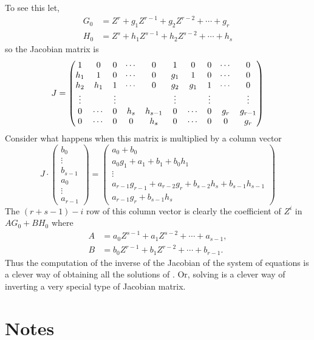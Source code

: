 {To see this let,
\[
\begin{aligned}
  G_0 &= Z^r + g_1 Z^{r-1} + g_2 Z^{r-2} + \cdots + g_r\\
  H_0 &=Z^s + h_1 Z^{s-1} + h_2 Z^{s-2} + \cdots + h_s
\end{aligned}
\]
so the Jacobian matrix is
\[
J = 
\begin{pmatrix}
1&0&0& \cdots&0&1&0&0&\cdots&0\\
h_1&1&0& \cdots&0&g_1&1&0&\cdots&0\\
h_2&h_1&1& \cdots&0&g_2&g_1&1&\cdots&0\\
\vdots&\null&\vdots&\null&\null&\vdots&\null&\vdots&\null&\vdots\\
0&\cdots&0&h_s&h_{s-1}&0&\cdots&0&g_r&g_{r-1}\\
0&\cdots&0&0&h_s&0&\cdots&0&0&g_r
\end{pmatrix}
\]
Consider what happens when this matrix is multiplied by a column vector
\[
J\cdot
\begin{pmatrix}
b_0\\ \vdots \\ b_{s-1}\\ a_0\\ \vdots\\ a_{r-1}
\end{pmatrix}
=
\begin{pmatrix}
a_0 +b_0\\
a_0 g_1 + a_1 + b_1 + b_0 h_1\\
\vdots\\
a_{r-1} g_{r-1} + a_{r-2} g_r + b_{s-2} h_{s} + b_{s-1} h_{s-1}\\
a_{r-1} g_{r} + b_{s-1} h_{s}
\end{pmatrix}
\]
The $(r+ s - 1) - i$ row of this column vector is clearly the coefficient
of $Z^i$ in $A G_0 + B H_0$ where
\[
\begin{aligned}
  A &= a_0 Z^{s-1} + a_1 Z^{s-2} + \cdots + a_{s-1},\\
  B &= b_0 Z^{r-1} + b_1 Z^{r-2} + \cdots + b_{r-1}.
\end{aligned}
\]
Thus the computation of the inverse of the Jacobian of the system of
equations is a clever way of obtaining all the solutions of
.  Or, solving
 is a clever way of inverting a very special
type of Jacobian matrix.

\section*{Notes}

}
